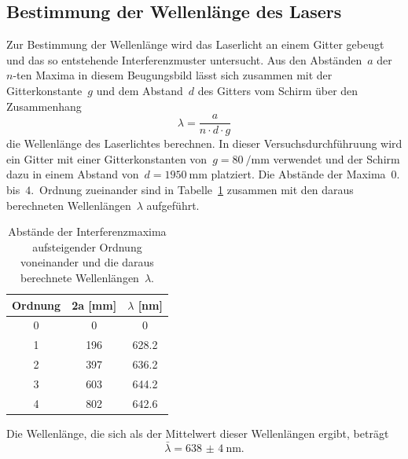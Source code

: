 \subsection{Bestimmung der Wellenlänge des Lasers}
%
Zur Bestimmung der Wellenlänge wird das Laserlicht an einem Gitter gebeugt und das so entstehende Interferenzmuster untersucht.
Aus den Abständen~$a$ der~$n$-ten Maxima in diesem Beugungsbild lässt sich zusammen mit der Gitterkonstante~$g$ und dem Abstand~$d$ des
Gitters vom Schirm über den Zusammenhang
%
\begin{equation}
  \lambda=\frac{a}{n\cdot d\cdot g}
\end{equation}
%
die Wellenlänge des Laserlichtes berechnen. In dieser Versuchsdurchführuung wird ein Gitter mit einer Gitterkonstanten von~$g=\SI{80}{\per\milli\meter}$ verwendet und der Schirm dazu in einem Abstand von~$d=\SI{1950}{\milli\meter}$ platziert. Die Abstände
der Maxima~$0.$ bis~$4.$~Ordnung zueinander sind in Tabelle~\ref{tab:wellenlaenge} zusammen mit den daraus berechneten Wellenlängen~$\lambda$ aufgeführt.
%
\begin{table}
  \centering
  \caption{Abstände der Interferenzmaxima aufsteigender Ordnung voneinander und die daraus berechnete Wellenlängen~$\lambda$.}
  \begin{tabular}{ccc}
    \toprule
    {Ordnung}  & {2a [mm]} & {$\lambda$ [nm]} \\
		\midrule
	  \SI{0 }{} & \SI{  0}{} & \SI{  0}{} \\
    \SI{1 }{} & \SI{196}{} & \SI{628.2}{} \\
		\SI{2 }{} & \SI{397}{} & \SI{636.2}{} \\
		\SI{3 }{} & \SI{603}{} & \SI{644.2}{} \\
		\SI{4 }{} & \SI{802}{} & \SI{642.6}{} \\
    \bottomrule
	\end{tabular}
  \label{tab:wellenlaenge}
\end{table}
%
Die Wellenlänge, die sich als der Mittelwert dieser Wellenlängen ergibt, beträgt
%
\begin{equation}
  \bar{\lambda}=\SI{638(4)}{\nano\meter}.
\end{equation}
